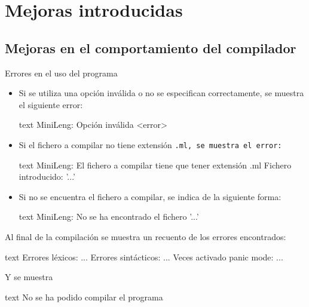 \documentclass[../main.tex]{subfiles}
\begin{document}
\section{Mejoras introducidas}

\subsection{Mejoras en el comportamiento del compilador}

Errores en el uso del programa

\begin{itemize}
\item Si se utiliza una opción inválida o no se especifican correctamente, se muestra el siguiente error:
\begin{codigo}{text}
MiniLeng: Opción inválida <error>
\end{codigo}

\item Si el fichero a compilar no tiene extensión \tt{.ml}, se muestra el error:
\begin{codigo}{text}
MiniLeng: El fichero a compilar tiene que tener extensión .ml
          Fichero introducido: '...'
\end{codigo}

\item Si no se encuentra el fichero a compilar, se indica de la siguiente forma:
\begin{codigo}{text}
MiniLeng: No se ha encontrado el fichero '...'
\end{codigo}

\end{itemize}

Al final de la compilación se muestra un recuento de los errores encontrados:

\begin{codigo}{text}
Errores léxicos: ...
Errores sintácticos: ...
Veces activado panic mode: ...
\end{codigo}

Y se muestra

\begin{codigo}{text}
No se ha podido compilar el programa
\end{codigo}
\end{document}
